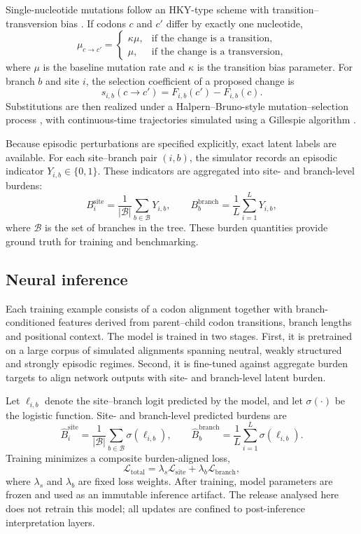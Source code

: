 \documentclass[11pt]{article}
\begin{document}
Single-nucleotide mutations follow an HKY-type scheme with transition--transversion bias \cite{Hasegawa1985}. If codons $c$ and $c'$ differ by exactly one nucleotide,
\[
\mu_{c\rightarrow c'}=
\begin{cases}
\kappa\mu, & \text{if the change is a transition},\\
\mu, & \text{if the change is a transversion},
\end{cases}
\]
where $\mu$ is the baseline mutation rate and $\kappa$ is the transition bias parameter. For branch $b$ and site $i$, the selection coefficient of a proposed change is
\[
s_{i,b}(c\rightarrow c')=F_{i,b}(c')-F_{i,b}(c).
\]
Substitutions are then realized under a Halpern--Bruno-style mutation--selection process \cite{HalpernBruno1998}, with continuous-time trajectories simulated using a Gillespie algorithm \cite{Gillespie1977}.

Because episodic perturbations are specified explicitly, exact latent labels are available. For each site--branch pair $(i,b)$, the simulator records an episodic indicator $Y_{i,b}\in\{0,1\}$. These indicators are aggregated into site- and branch-level burdens:
\[
B_i^{\mathrm{site}}=\frac{1}{|\mathcal{B}|}\sum_{b\in\mathcal{B}} Y_{i,b},
\qquad
B_b^{\mathrm{branch}}=\frac{1}{L}\sum_{i=1}^{L} Y_{i,b},
\]
where $\mathcal{B}$ is the set of branches in the tree. These burden quantities provide ground truth for training and benchmarking.

\subsection{Neural inference}

Each training example consists of a codon alignment together with branch-conditioned features derived from parent--child codon transitions, branch lengths and positional context. The model is trained in two stages. First, it is pretrained on a large corpus of simulated alignments spanning neutral, weakly structured and strongly episodic regimes. Second, it is fine-tuned against aggregate burden targets to align network outputs with site- and branch-level latent burden.

Let $\ell_{i,b}$ denote the site--branch logit predicted by the model, and let $\sigma(\cdot)$ be the logistic function. Site- and branch-level predicted burdens are
\[
\hat B_i^{\mathrm{site}}=\frac{1}{|\mathcal{B}|}\sum_{b\in\mathcal{B}}\sigma(\ell_{i,b}),
\qquad
\hat B_b^{\mathrm{branch}}=\frac{1}{L}\sum_{i=1}^{L}\sigma(\ell_{i,b}).
\]
Training minimizes a composite burden-aligned loss,
\[
\mathcal{L}_{\mathrm{total}}=\lambda_s\mathcal{L}_{\mathrm{site}}+\lambda_b\mathcal{L}_{\mathrm{branch}},
\]
where $\lambda_s$ and $\lambda_b$ are fixed loss weights. After training, model parameters are frozen and used as an immutable inference artifact. The release analysed here does not retrain this model; all updates are confined to post-inference interpretation layers.
\end{document}

